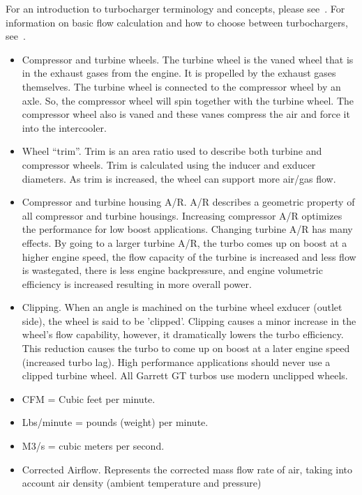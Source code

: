 \documentclass[11pt,a4paper]{book}
\begin{document}
For an introduction to turbocharger terminology and concepts, please
see~\cite{GarrettTerminology}. For information on basic flow calculation and how
to choose between turbochargers, see~\cite{TurboSelection}.
\begin{itemize}
    \item Compressor and turbine wheels. The turbine wheel is the vaned wheel
        that is in the exhaust gases from the engine. It is propelled by the
        exhaust gases themselves. The turbine wheel is connected to the
        compressor wheel by an axle. So, the compressor wheel will spin together
        with the turbine wheel. The compressor wheel also is vaned and these
        vanes compress the air and force it into the intercooler.
    \item Wheel “trim”. Trim is an area ratio used to describe both turbine and
        compressor wheels. Trim is calculated using the inducer and exducer
        diameters. As trim is increased, the wheel can support more air/gas flow.
    \item Compressor and turbine housing A/R. A/R describes a geometric property of
        all compressor and turbine housings. Increasing compressor A/R optimizes the
        performance for low boost applications. Changing turbine A/R has many
        effects. By going to a larger turbine A/R, the turbo comes up on boost at a
        higher engine speed, the flow capacity of the turbine is increased and less
        flow is wastegated, there is less engine backpressure, and engine volumetric
        efficiency is increased resulting in more overall power.
    \item Clipping. When an angle is machined on the turbine wheel exducer (outlet
        side), the wheel is said to be 'clipped'. Clipping causes a minor increase
        in the wheel's flow capability, however, it dramatically lowers the turbo
        efficiency. This reduction causes the turbo to come up on boost at a
        later engine speed (increased turbo lag). High performance applications
        should never use a clipped turbine wheel. All Garrett GT turbos use
        modern unclipped wheels.
    \item CFM = Cubic feet per minute.
    \item Lbs/minute = pounds (weight) per minute.
    \item M3/s = cubic meters per second.
    \item Corrected Airflow. Represents the corrected mass flow rate of air,
        taking into account air density (ambient temperature and pressure)


\end{itemize}
\end{document}
